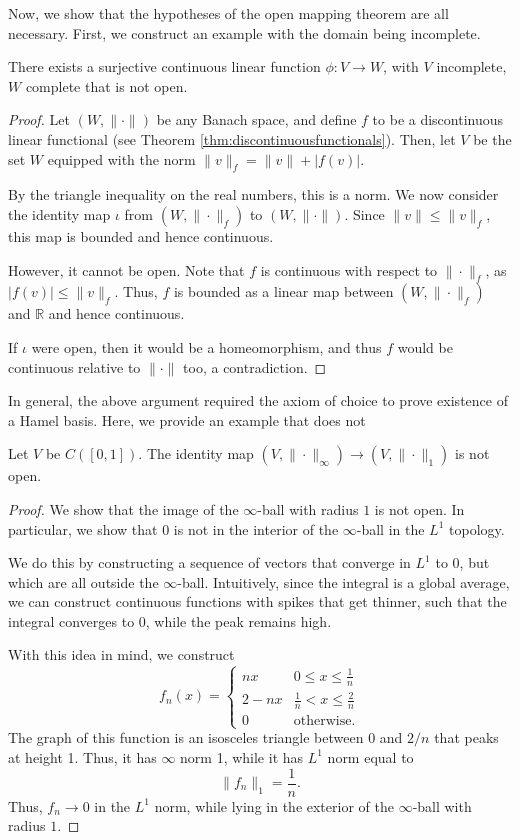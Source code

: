 \documentclass[twoside,symmetric, openany, 12pt]{./tuftebook}
\theoremstyle{definition}
\theoremstyle{definition}
\theoremstyle{definition}
\newcommand{\R}{\mathbb{R}}
\begin{document}
Now, we show that the hypotheses of the open mapping theorem are all necessary. First, we construct an example with the domain being incomplete.
\begin{Example}
	There exists a surjective continuous linear function $\phi: V \to W$, with $V$ incomplete, $W$ complete that is not open.
\end{Example}
\begin{proof}
	Let $(W, \|\cdot\|)$ be any Banach space, and define $f$ to be a discontinuous linear functional (see Theorem \ref{thm:discontinuousfunctionals}). Then, let $V$ be the set $W$ equipped with the norm $\|v\|_f = \|v\| + |f(v)|$.
	
	By the triangle inequality on the real numbers, this is a norm. We now consider the identity map $\iota$ from $(W, \|\cdot\|_f)$ to $(W, \|\cdot \|)$. Since $\|v\| \le \|v\|_f$, this map is bounded and hence continuous.
	
	However, it cannot be open. Note that $f$ is continuous with respect to $\|\cdot\|_f$, as $|f(v)|\le \|v\|_f$. Thus, $f$ is bounded as a linear map between $(W, \|\cdot\|_f)$ and $\R$ and hence continuous. 
	
	If $\iota$ were open, then it would be a homeomorphism, and thus $f$ would be continuous relative to $\|\cdot\|$ too, a contradiction.
\end{proof}
In general, the above argument required the axiom of choice to prove existence of a Hamel basis. Here, we provide an example that does not
\begin{Example}
	Let $V$ be $C([0,1])$. The identity map $(V, \|\cdot\|_\infty)\to (V, \|\cdot\|_1)$ is not open. 
\end{Example}
\begin{proof}
	We show that the image of the $\infty$-ball with radius $1$ is not open. In particular, we show that $0$ is not in the interior of the $\infty$-ball in the $L^1$ topology. 
	
	We do this by constructing a sequence of vectors that converge in $L^1$ to $0$, but which are all outside the $\infty$-ball. Intuitively, since the integral is a global average, we can construct continuous functions with spikes that get thinner, such that the integral converges to 0, while the peak remains high. 
	
	With this idea in mind, we construct
	\[f_n(x) = \begin{cases}
		nx & 0 \le x \le \frac 1n\\
		2 - nx & \frac 1n < x \le \frac 2n\\
		0 & \text{otherwise.}
	\end{cases}\]
The graph of this function is an isosceles triangle between $0$ and $2/n$ that peaks at height 1. Thus, it has $\infty$ norm 1, while it has $L^1$ norm equal to
\[\|f_n\|_1 = \frac 1n.\]
Thus, $f_n\to 0$ in the $L^1$ norm, while lying in the exterior of the $\infty$-ball with radius $1$. 
\end{proof}
\end{document}

